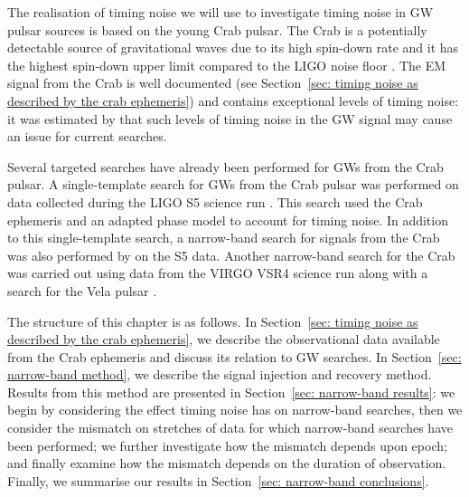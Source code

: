 \documentclass[../full_thesis/full_thesis.tex]{subfiles}
\begin{document}
The realisation of timing noise we will use to investigate timing noise in GW
pulsar sources is based on the young Crab pulsar. The Crab is a potentially
detectable  source of gravitational waves due to its high spin-down rate and it
has the highest spin-down upper limit compared to the LIGO noise floor
\citep{abbott2008beating}. The EM signal from the Crab is well documented (see
Section~\ref{sec: timing noise as described by the crab ephemeris}) and contains
exceptional levels of timing noise: it was estimated by \citet{Jones2004} that
such levels of timing noise in the GW signal may cause an issue for current
searches.

Several targeted searches have already
been performed for GWs from the Crab pulsar.
A single-template search for GWs from the Crab pulsar was performed on data
collected during the LIGO S5 science run \citep{abbott2008beating}.  This search used
the Crab ephemeris and an adapted phase model to account for timing noise.  In
addition to this single-template search, a narrow-band search for signals from
the Crab was also performed by \citet{abbott2008beating} on the S5 data. Another
narrow-band search for the Crab was carried out using data from the VIRGO
VSR4 science run along with a search for the Vela pulsar \citep{aasi2015narrow}.

The structure of this chapter is as follows. In Section~\ref{sec: timing noise
as described by the crab ephemeris}, we describe the observational data
available from the Crab ephemeris and discuss its relation to GW searches. In
Section~\ref{sec: narrow-band method}, we describe the signal injection and
recovery method.  Results from this method are presented in Section~\ref{sec:
narrow-band results}: we begin by considering the effect timing noise has on
narrow-band searches, then we consider the mismatch on stretches of data for
which narrow-band searches have been performed; we further investigate how the
mismatch depends upon epoch; and finally examine how the mismatch depends on
the duration of observation. Finally, we summarise our results in Section~\ref{sec:
narrow-band conclusions}.
\end{document}
